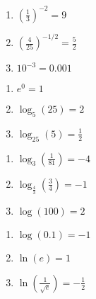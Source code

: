 \begin{multicols}{3}
\begin{enumerate}
\setcounter{enumi}{\value{HW}}

\item  $\left(\frac{1}{3}\right)^{-2} = 9$  

\item  $\left(\frac{4}{25}\right)^{-1/2} = \frac{5}{2}$  

\item  $10^{-3} = 0.001$ 

\setcounter{HW}{\value{enumi}}
\end{enumerate}
\end{multicols}

\begin{multicols}{3}
\begin{enumerate}
\setcounter{enumi}{\value{HW}}

\item  $e^{0}  = 1$  

\item  $\log_{5}(25) = 2$  

\item  $\log_{25} (5) = \frac{1}{2}$  

\setcounter{HW}{\value{enumi}}
\end{enumerate}
\end{multicols}

\begin{multicols}{3}
\begin{enumerate}
\setcounter{enumi}{\value{HW}}

\item  $\log_{3} \left(\frac{1}{81} \right) = -4$  

\item  $\log_{\frac{4}{3}} \left(\frac{3}{4} \right) = -1$  

\item  $\log(100) = 2$  

\setcounter{HW}{\value{enumi}}
\end{enumerate}
\end{multicols}

\begin{multicols}{3}
\begin{enumerate}
\setcounter{enumi}{\value{HW}}

\item  $\log (0.1) = -1$  

\item  $\ln(e) = 1$ 

\item  $\ln\left(\frac{1}{\sqrt{e}}\right) = -\frac{1}{2}$  \label{rewritelastex}

\setcounter{HW}{\value{enumi}}
\end{enumerate}
\end{multicols}

